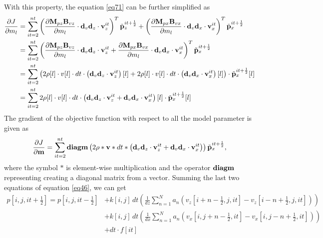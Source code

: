 \documentclass[revised,endfloat]{geophysics}
\begin{document}
With this property, the equation \ref{eq71} can be further simplified as
\begin{equation}
\begin{split}
\frac{\partial J}{{\partial m}_l} &= \sum_{it=2}^{nt} \left( \frac{{\partial \bf M}_{pz}{\bf B}_{vz}}{\partial m_l} \cdot {\bf d}_v{\bf d}_z \cdot {\bf v}_z^{it} \right)^T \tilde{{\bf p}}_z^{it+\frac{1}{2}} +  \left( \frac{{\partial \bf M}_{px}{\bf B}_{vx}}{\partial m_l} \cdot {\bf d}_v{\bf d}_x \cdot {\bf v}_x^{it} \right)^T \tilde{{\bf p}}_x^{it+\frac{1}{2}} \\
&= \sum_{it=2}^{nt} \left( \frac{{\partial \bf M}_{pz}{\bf B}_{vz}}{\partial m_l} \cdot {\bf d}_v{\bf d}_z \cdot {\bf v}_z^{it} +  \frac{{\partial \bf M}_{px}{\bf B}_{vx}}{\partial m_l} \cdot {\bf d}_v{\bf d}_x \cdot {\bf v}_x^{it} \right)^T \tilde{{\bf p}}_x^{it+\frac{1}{2}}  \\
&=\sum_{it=2}^{nt} \left( 2\rho[l]\cdot v[l] \cdot dt \cdot \left( {\bf d}_v{\bf d}_z \cdot {\bf v}_z^{it}\right)[l] +  2\rho[l]\cdot v[l] \cdot dt \cdot \left( {\bf d}_v{\bf d}_x \cdot {\bf v}_x^{it} \right)[l] \right) \cdot \tilde{{\bf p}}_x^{it+\frac{1}{2}} [l]\\
&=\sum_{it=2}^{nt} 2\rho[l]\cdot v[l] \cdot dt \cdot \left( {\bf d}_v{\bf d}_z \cdot {\bf v}_z^{it}+  {\bf d}_v{\bf d}_x \cdot {\bf v}_x^{it} \right)[l] \cdot \tilde{{\bf p}}_x^{it+\frac{1}{2}} [l] \\
\end{split}
\label{eq77}
\end{equation}
The gradient of the objective function with respect to all the model parameter is given as
\begin{equation}
\frac{\partial J}{{\partial \bf m}} = \sum_{it=2}^{nt} {\bf diagm} \left( 2 {\bf \rho} \ast {\bf v} \ast dt \ast \left( {\bf d}_v{\bf d}_z \cdot {\bf v}_z^{it}+  {\bf d}_v{\bf d}_x \cdot {\bf v}_x^{it} \right)   \right) \tilde{{\bf p}}_x^{it+\frac{1}{2}} ,
\label{eq78}
\end{equation}
where the symbol $*$ is element-wise multiplication and the operator ${\bf diagm}$ representing creating a diagonal matrix from a vector.
Summing the last two equations of equation \ref{eq46},  we can get
\begin{equation}
\begin{split}
p[i,j,it+\frac{1}{2}] =  p[i,j,it-\frac{1}{2}] &+ k[i,j] \, dt \left(\frac{1}{dz} \sum_{n=1}^N  a_n \left( v_z[i+n-\frac{1}{2},j,it] - v_z[i-n+\frac{1}{2},j,it] \right)  \right) \\
&+ k[i,j]\, dt \left(\frac{1}{dx} \sum_{n=1}^N  a_n \left(v_x[i,j+n-\frac{1}{2},it] - v_x[i,j-n+\frac{1}{2},it] \right) \right) \\
&+ dt \cdot f[it]   
\end{split}
\label{eq79}
\end{equation}
\end{document}
